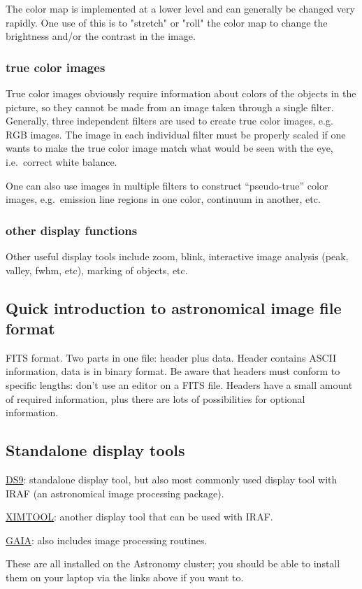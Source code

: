 \documentclass{article}
\begin{document}
The color map is implemented at a lower level and can generally be
changed very rapidly. One use of this is to "stretch" or "roll" the
color map to change the brightness and/or the contrast in the image.

\subsubsection*{true color images}
True color images obviously require information about colors of the
objects in the picture, so they cannot be made from an image taken
through a single filter. Generally, three independent filters are used
to create true color images, e.g. RGB images. The image in each
individual filter must be properly scaled if one wants to make the
true color image match what would be seen with the eye, i.e.\ correct
white balance.

One can also use images in multiple filters to construct
``pseudo-true'' color images, e.g.\ emission line regions in one color,
continuum in another, etc.

\subsubsection*{other display functions}
Other useful display tools include zoom, blink, interactive image
analysis (peak, valley, fwhm, etc), marking of objects, etc.

\subsection*{Quick introduction to astronomical image file format}
FITS format. Two parts in one file: header plus data. Header contains
ASCII information, data is in binary format. Be aware that headers must
conform to specific lengths: don't use an editor on a FITS file.
Headers have a small amount of required information, plus there are
lots of possibilities for optional information.

\subsection*{Standalone display tools}
\begin{itemize*}
    \item \href{http://ds9.si.edu/site/Home.html}
        {DS9}: standalone display tool, but also most commonly used
        display tool with IRAF (an astronomical image processing
        package).
    \item \href{http://iraf.noao.edu/x11iraf/x11iraf.html}
        {XIMTOOL}: another display tool that can be used with IRAF.
    \item \href{http://starlink.eao.hawaii.edu/starlink/}
        {GAIA}: also includes image processing routines.
\end{itemize*}
These are all installed on the Astronomy cluster; you should be able to
install them on your laptop via the links above if you want to.
\end{document}
